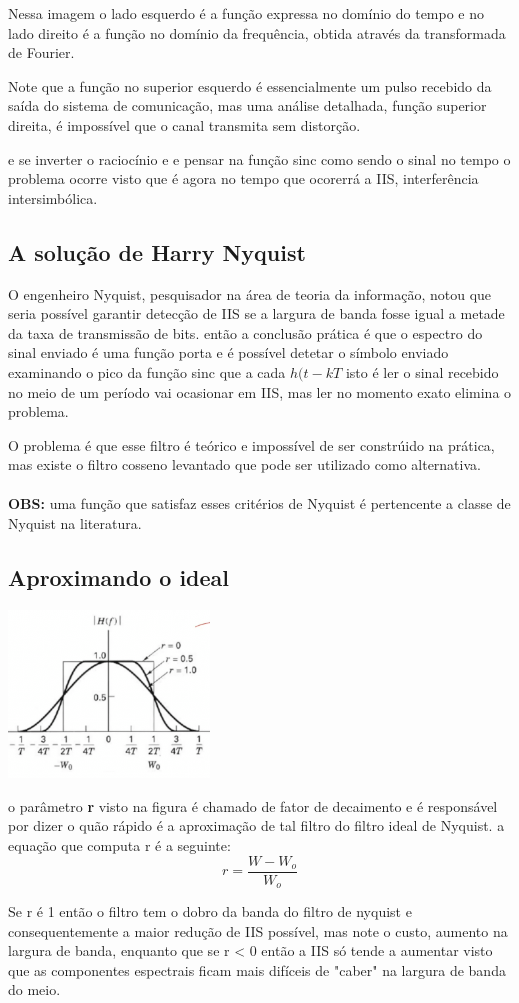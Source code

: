 Nessa imagem o lado esquerdo é a função expressa no domínio do tempo e no lado direito é a função no domínio da frequência, obtida através da transformada de Fourier.

Note que a função no superior esquerdo é essencialmente um pulso recebido da saída do sistema de comunicação, mas uma análise detalhada, função superior direita, é impossível
que o canal transmita sem distorção.

e se inverter o raciocínio e e pensar na função sinc como sendo o sinal no tempo o problema ocorre visto que é agora no tempo que ocorerrá a IIS, interferência intersimbólica.

\subsection{A solução de Harry Nyquist}

O engenheiro Nyquist, pesquisador na área de teoria da informação, notou que seria possível garantir detecção de IIS se a largura de banda fosse igual a metade da taxa de transmissão de bits.
então a conclusão prática é que o espectro do sinal enviado é uma função porta e é possível detetar o símbolo enviado examinando o pico da função sinc que a cada $h(t-kT$ isto é ler o sinal recebido
no meio de um período vai ocasionar em IIS, mas ler no momento exato elimina o problema.

O problema é que esse filtro é teórico e impossível de ser constrúido na prática, mas existe o filtro cosseno levantado que pode ser utilizado como alternativa.
\\\\
\textbf{OBS:} uma função que satisfaz esses critérios de Nyquist é pertencente a classe de Nyquist na literatura.

\subsection{Aproximando o ideal}


\includegraphics[width=0.4\textwidth]{../assets/cos.png}\cite{dc}

o parâmetro \textbf{r} visto na figura  é chamado de fator de decaimento e é responsável por dizer o quão rápido é a aproximação de tal filtro do filtro ideal de Nyquist.
a equação que computa r é a seguinte:
\begin{equation}
	r = \frac{W - W_o}{W_o}
\end{equation}

Se r é 1 então o filtro tem o dobro da banda do filtro de nyquist e consequentemente a maior redução de IIS possível, mas note o custo, aumento na largura de banda, enquanto que se
r < 0 então a IIS só tende a aumentar visto que as componentes espectrais ficam mais difíceis de "caber" na largura de banda do meio.


